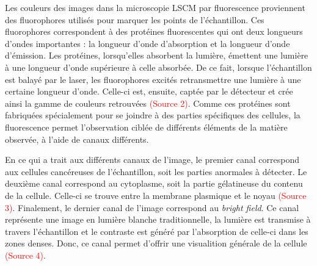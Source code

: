 \documentclass[11pt,letterpaper]{article}
\begin{document}
Les couleurs des images dans la microscopie LSCM par fluorescence proviennent des fluorophores utilisés pour marquer les points de l'échantillon. Ces fluorophores correspondent à des protéines fluorescentes qui ont deux longueurs d'ondes importantes : la longueur d'onde d'absorption et la longueur d'onde d'émission. Les protéines, lorsqu'elles absorbent la lumière, émettent une lumière à une longueur d'onde supérieure à celle absorbée. De ce fait, lorsque l'échantillon est balayé par le laser, les fluorophores excités retransmettre une lumière à une certaine longueur d'onde. Celle-ci est, ensuite, captée par le détecteur et crée ainsi la gamme de couleurs retrouvées \textcolor{red}{(Source 2)}. Comme ces protéines sont fabriquées spécialement pour se joindre à des parties spécifiques des cellules, la fluorescence permet l'observation ciblée de différents éléments de la matière observée, à l'aide de canaux différents.

En ce qui a trait aux différents canaux de l'image, le premier canal correspond aux cellules cancéreuses de l'échantillon, soit les parties anormales à détecter. Le deuxième canal correspond au cytoplasme, soit la partie gélatineuse du contenu de la cellule. Celle-ci se trouve entre la membrane plasmique et le noyau \textcolor{red}{(Source 3)}. Finalement, le dernier canal de l'image correspond au \textit{bright field}. Ce canal représente une image en lumière blanche traditionnelle, la lumière est transmise à travers l'échantillon et le contraste est généré par l'absorption de celle-ci dans les zones denses. Donc, ce canal permet d'offrir une visualition générale de la cellule \textcolor{red}{(Source 4)}.





\end{document}
